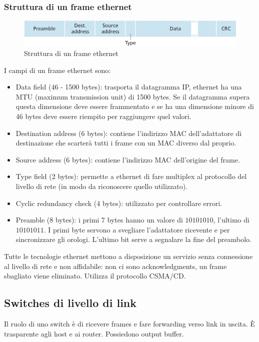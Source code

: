 \subsubsection{Struttura di un frame ethernet}
\begin{figure}[h]
\includegraphics[width=\textwidth]{EthernetFrame.png}
\caption{Struttura di un frame ethernet}
\end{figure}
I campi di un frame ethernet sono:
\begin{itemize}
\item Data field (46 - 1500 bytes): trasporta il datagramma IP, ethernet ha una MTU (maximum transmission unit) di 1500 bytes. Se il datagramma supera questa dimensione deve essere frammentato e se ha
una dimensione minore di 46 bytes deve essere riempito per raggiungere quel valori.
\item Destination address (6 bytes): contiene l'indirizzo MAC dell'adattatore di destinazione che scarter\`a tutti i frame con un MAC diverso dal proprio.
\item Source address (6 bytes): contiene l'indirizzo MAC dell'origine del frame.
\item Type field (2 bytes): permette a ethernet di fare multiplex al protocollo del livello di rete (in modo da riconoscere quello utilizzato).
\item Cyclic redundancy check (4 bytes): utilizzato per controllare errori.
\item Preamble (8 bytes): i primi 7 bytes hanno un valore di $10101010$, l'ultimo di $10101011$. I primi byte servono a svegliare l'adattatore ricevente e per sincronizzare gli orologi. L'ultimo bit serve a 
segnalare la fine del preambolo.
\end{itemize}
Tutte le tecnologie ethernet mettono a disposizione un servizio senza connessione al livello di rete e non affidabile: non ci sono acknowledgments, un frame sbagliato viene eliminato. Utilizza il protocollo 
CSMA/CD.
\subsection{Switches di livello di link}
Il ruolo di uno switch \`e di ricevere frames e fare forwarding verso link in uscita. \`E trasparente agli host e ai router. Possiedono output buffer.
